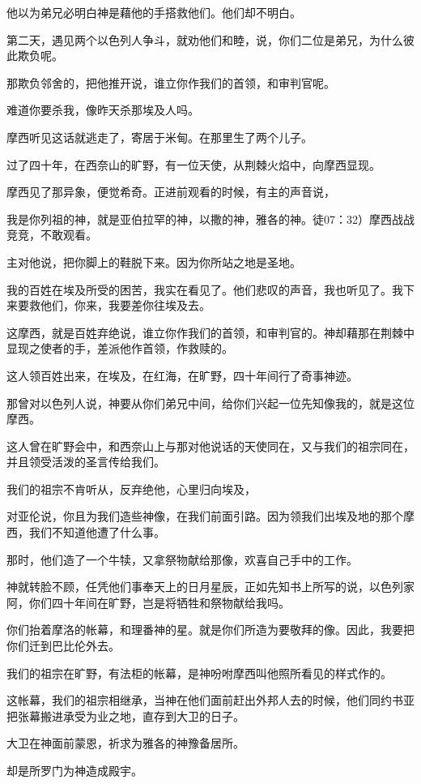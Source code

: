 \documentclass[12pt,oneside]{book}
\begin{document}
他以为弟兄必明白神是藉他的手搭救他们。他们却不明白。

第二天，遇见两个以色列人争斗，就劝他们和睦，说，你们二位是弟兄，为什么彼此欺负呢。

那欺负邻舍的，把他推开说，谁立你作我们的首领，和审判官呢。

难道你要杀我，像昨天杀那埃及人吗。

摩西听见这话就逃走了，寄居于米甸。在那里生了两个儿子。

过了四十年，在西奈山的旷野，有一位天使，从荆棘火焰中，向摩西显现。

摩西见了那异象，便觉希奇。正进前观看的时候，有主的声音说，

我是你列祖的神，就是亚伯拉罕的神，以撒的神，雅各的神。徒07：32）摩西战战竞竞，不敢观看。

主对他说，把你脚上的鞋脱下来。因为你所站之地是圣地。

我的百姓在埃及所受的困苦，我实在看见了。他们悲叹的声音，我也听见了。我下来要救他们，你来，我要差你往埃及去。

这摩西，就是百姓弃绝说，谁立你作我们的首领，和审判官的。神却藉那在荆棘中显现之使者的手，差派他作首领，作救赎的。

这人领百姓出来，在埃及，在红海，在旷野，四十年间行了奇事神迹。

那曾对以色列人说，神要从你们弟兄中间，给你们兴起一位先知像我的，就是这位摩西。

这人曾在旷野会中，和西奈山上与那对他说话的天使同在，又与我们的祖宗同在，并且领受活泼的圣言传给我们。

我们的祖宗不肯听从，反弃绝他，心里归向埃及，

对亚伦说，你且为我们造些神像，在我们前面引路。因为领我们出埃及地的那个摩西，我们不知道他遭了什么事。

那时，他们造了一个牛犊，又拿祭物献给那像，欢喜自己手中的工作。

神就转脸不顾，任凭他们事奉天上的日月星辰，正如先知书上所写的说，以色列家阿，你们四十年间在旷野，岂是将牺牲和祭物献给我吗。

你们抬着摩洛的帐幕，和理番神的星。就是你们所造为要敬拜的像。因此，我要把你们迁到巴比伦外去。

我们的祖宗在旷野，有法柜的帐幕，是神吩咐摩西叫他照所看见的样式作的。

这帐幕，我们的祖宗相继承，当神在他们面前赶出外邦人去的时候，他们同约书亚把张幕搬进承受为业之地，直存到大卫的日子。

大卫在神面前蒙恩，祈求为雅各的神豫备居所。

却是所罗门为神造成殿宇。
\end{document}
